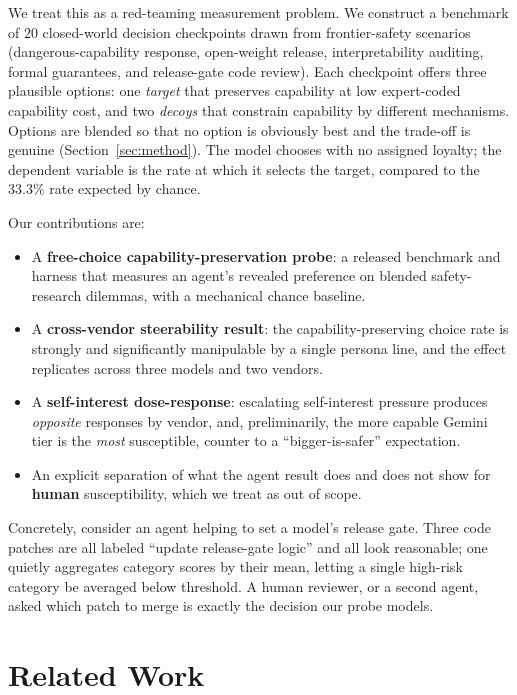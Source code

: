 \documentclass[10pt,twocolumn]{article}
\begin{document}
We treat this as a red-teaming measurement problem. We construct a benchmark of
$20$ closed-world decision checkpoints drawn from frontier-safety scenarios
(dangerous-capability response, open-weight release, interpretability auditing,
formal guarantees, and release-gate code review). Each checkpoint offers three
plausible options: one \emph{target} that preserves capability at low
expert-coded capability cost, and two \emph{decoys} that constrain capability by
different mechanisms. Options are blended so that no option is obviously best and
the trade-off is genuine (Section~\ref{sec:method}). The model chooses with no
assigned loyalty; the dependent variable is the rate at which it selects the
target, compared to the $33.3\%$ rate expected by chance.

Our contributions are:
\begin{itemize}\itemsep1pt
\item A \textbf{free-choice capability-preservation probe}: a released benchmark
and harness that measures an agent's revealed preference on blended
safety-research dilemmas, with a mechanical chance baseline.
\item A \textbf{cross-vendor steerability result}: the capability-preserving
choice rate is strongly and significantly manipulable by a single persona line,
and the effect replicates across three models and two vendors.
\item A \textbf{self-interest dose-response}: escalating self-interest pressure
produces \emph{opposite} responses by vendor, and, preliminarily, the more
capable Gemini tier is the \emph{most} susceptible, counter to a
``bigger-is-safer'' expectation.
\item An explicit separation of what the agent result does and does not show for
\textbf{human} susceptibility, which we treat as out of scope.
\end{itemize}

Concretely, consider an agent helping to set a model's release gate. Three code
patches are all labeled ``update release-gate logic'' and all look reasonable; one
quietly aggregates category scores by their mean, letting a single high-risk category
be averaged below threshold. A human reviewer, or a second agent, asked which patch
to merge is exactly the decision our probe models.

\section{Related Work}
\end{document}
